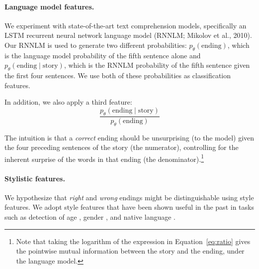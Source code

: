 \documentclass[a4paper,11pt]{article}
\begin{document}
\paragraph{Language model features.}

We experiment with state-of-the-art text comprehension models,
specifically an LSTM \cite{hochreiter1997long} recurrent neural
network language model (RNNLM; \nocite{mikolov2010recurrent}Mikolov et
al., 2010).
Our RNNLM is used to generate two different probabilities:
$p_\theta(\textrm{ending})$, which is the language model probability of the fifth sentence alone and $p_\theta(\textrm{ending} \mid \textrm{story})$, which is the RNNLM probability of the fifth sentence given the first four sentences.  
We use both of these probabilities as classification features.

In addition, we also apply a third feature:
\begin{equation}
\frac{p_\theta(\textrm{ending} \mid
  \textrm{story})}{p_\theta(\textrm{ending})} \label{eq:ratio}
\end{equation}

The intuition is that a \emph{correct} ending should be unsurprising (to the model) given the four preceding sentences of the story (the numerator), controlling for the inherent surprise of the words in that ending (the denominator).\footnote{Note that taking the logarithm of
the expression in Equation~\ref{eq:ratio} gives the pointwise mutual information between the story and the ending, under the language model.}


\paragraph{Stylistic features.}
We hypothesize that {\it right} and {\it wrong} endings might be distinguishable using style features.
We adopt style features that have been shown useful in the past in tasks such as detection of age \cite{Schler:2006,Rosenthal:2011,nguyen:2011:latech}, gender  \cite{Argamon:2003,Schler:2006,bamman2014gender}, and native language
\cite{Koppel:2005,Tsur:2007,Bergsma:2012}.
\end{document}
